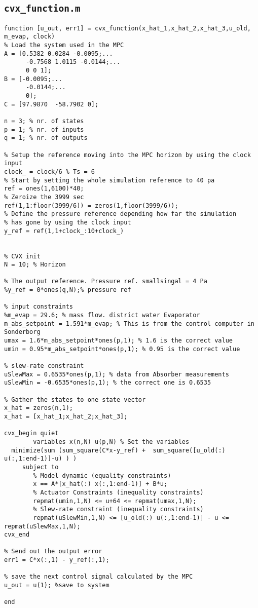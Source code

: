 \subsection*{\texttt{cvx\_function.m}}
\begin{lstlisting}
function [u_out, err1] = cvx_function(x_hat_1,x_hat_2,x_hat_3,u_old, m_evap, clock)
% Load the system used in the MPC
A = [0.5382 0.0284 -0.0095;...
      -0.7568 1.0115 -0.0144;...
      0 0 1];
B = [-0.0095;...
      -0.0144;...
      0];
C = [97.9870  -58.7902 0];

n = 3; % nr. of states
p = 1; % nr. of inputs
q = 1; % nr. of outputs

% Setup the reference moving into the MPC horizon by using the clock input
clock_ = clock/6 % Ts = 6
% Start by setting the whole simulation reference to 40 pa
ref = ones(1,6100)*40;
% Zeroize the 3999 sec
ref(1,1:floor(3999/6)) = zeros(1,floor(3999/6));
% Define the pressure reference depending how far the simulation
% has gone by using the clock input
y_ref = ref(1,1+clock_:10+clock_)
 

% CVX init
N = 10; % Horizon

% The output reference. Pressure ref. smallsingal = 4 Pa
%y_ref = 0*ones(q,N);% pressure ref

% input constraints
%m_evap = 29.6; % mass flow. district water Evaporator
m_abs_setpoint = 1.591*m_evap; % This is from the control computer in Sonderborg
umax = 1.6*m_abs_setpoint*ones(p,1); % 1.6 is the correct value
umin = 0.95*m_abs_setpoint*ones(p,1); % 0.95 is the correct value

% slew-rate constraint
uSlewMax = 0.6535*ones(p,1); % data from Absorber measurements
uSlewMin = -0.6535*ones(p,1); % the correct one is 0.6535

% Gather the states to one state vector
x_hat = zeros(n,1);
x_hat = [x_hat_1;x_hat_2;x_hat_3];
 
cvx_begin quiet
        variables x(n,N) u(p,N) % Set the variables
  minimize(sum (sum_square(C*x-y_ref) +  sum_square([u_old(:) u(:,1:end-1)]-u) ) )
     subject to
        % Model dynamic (equality constraints)
        x == A*[x_hat(:) x(:,1:end-1)] + B*u;
        % Actuator Constraints (inequality constraints)
        repmat(umin,1,N) <= u+64 <= repmat(umax,1,N);
        % Slew-rate constraint (inequality constraints)
        repmat(uSlewMin,1,N) <= [u_old(:) u(:,1:end-1)] - u <= repmat(uSlewMax,1,N);
cvx_end

% Send out the output error
err1 = C*x(:,1) - y_ref(:,1);

% save the next control signal calculated by the MPC
u_out = u(1); %save to system

end
\end{lstlisting}